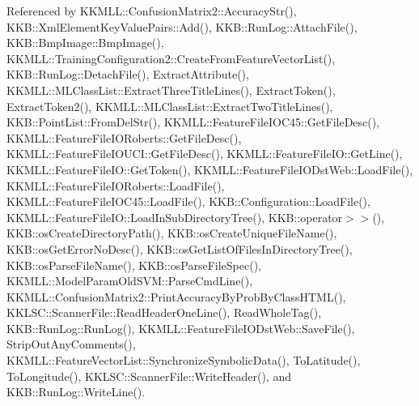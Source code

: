 Referenced by K\+K\+M\+L\+L\+::\+Confusion\+Matrix2\+::\+Accuracy\+Str(), K\+K\+B\+::\+Xml\+Element\+Key\+Value\+Pairs\+::\+Add(), K\+K\+B\+::\+Run\+Log\+::\+Attach\+File(), K\+K\+B\+::\+Bmp\+Image\+::\+Bmp\+Image(), K\+K\+M\+L\+L\+::\+Training\+Configuration2\+::\+Create\+From\+Feature\+Vector\+List(), K\+K\+B\+::\+Run\+Log\+::\+Detach\+File(), Extract\+Attribute(), K\+K\+M\+L\+L\+::\+M\+L\+Class\+List\+::\+Extract\+Three\+Title\+Lines(), Extract\+Token(), Extract\+Token2(), K\+K\+M\+L\+L\+::\+M\+L\+Class\+List\+::\+Extract\+Two\+Title\+Lines(), K\+K\+B\+::\+Point\+List\+::\+From\+Del\+Str(), K\+K\+M\+L\+L\+::\+Feature\+File\+I\+O\+C45\+::\+Get\+File\+Desc(), K\+K\+M\+L\+L\+::\+Feature\+File\+I\+O\+Roberts\+::\+Get\+File\+Desc(), K\+K\+M\+L\+L\+::\+Feature\+File\+I\+O\+U\+C\+I\+::\+Get\+File\+Desc(), K\+K\+M\+L\+L\+::\+Feature\+File\+I\+O\+::\+Get\+Line(), K\+K\+M\+L\+L\+::\+Feature\+File\+I\+O\+::\+Get\+Token(), K\+K\+M\+L\+L\+::\+Feature\+File\+I\+O\+Dst\+Web\+::\+Load\+File(), K\+K\+M\+L\+L\+::\+Feature\+File\+I\+O\+Roberts\+::\+Load\+File(), K\+K\+M\+L\+L\+::\+Feature\+File\+I\+O\+C45\+::\+Load\+File(), K\+K\+B\+::\+Configuration\+::\+Load\+File(), K\+K\+M\+L\+L\+::\+Feature\+File\+I\+O\+::\+Load\+In\+Sub\+Directory\+Tree(), K\+K\+B\+::operator$>$$>$(), K\+K\+B\+::os\+Create\+Directory\+Path(), K\+K\+B\+::os\+Create\+Unique\+File\+Name(), K\+K\+B\+::os\+Get\+Error\+No\+Desc(), K\+K\+B\+::os\+Get\+List\+Of\+Files\+In\+Directory\+Tree(), K\+K\+B\+::os\+Parse\+File\+Name(), K\+K\+B\+::os\+Parse\+File\+Spec(), K\+K\+M\+L\+L\+::\+Model\+Param\+Old\+S\+V\+M\+::\+Parse\+Cmd\+Line(), K\+K\+M\+L\+L\+::\+Confusion\+Matrix2\+::\+Print\+Accuracy\+By\+Prob\+By\+Class\+H\+T\+M\+L(), K\+K\+L\+S\+C\+::\+Scanner\+File\+::\+Read\+Header\+One\+Line(), Read\+Whole\+Tag(), K\+K\+B\+::\+Run\+Log\+::\+Run\+Log(), K\+K\+M\+L\+L\+::\+Feature\+File\+I\+O\+Dst\+Web\+::\+Save\+File(), Strip\+Out\+Any\+Comments(), K\+K\+M\+L\+L\+::\+Feature\+Vector\+List\+::\+Synchronize\+Symbolic\+Data(), To\+Latitude(), To\+Longitude(), K\+K\+L\+S\+C\+::\+Scanner\+File\+::\+Write\+Header(), and K\+K\+B\+::\+Run\+Log\+::\+Write\+Line().


